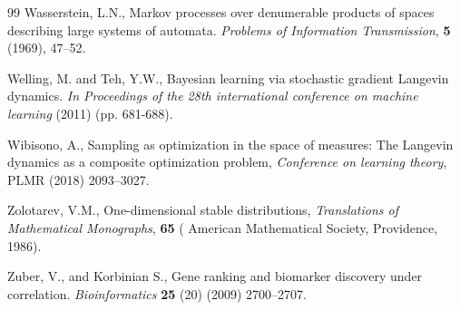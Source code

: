 \documentclass{article}
\begin{document}
\begin{thebibliography}{99}
 Wasserstein, L.N., Markov processes over denumerable products of spaces describing large systems of automata. \emph{Problems of Information Transmission},  \textbf{5} (1969), 47--52.

Welling, M. and Teh, Y.W.,  Bayesian learning via stochastic gradient Langevin dynamics. \emph{In Proceedings of the 28th international conference on machine learning} (2011)   (pp. 681-688).

Wibisono, A., Sampling as optimization in the space of measures: The Langevin dynamics as a composite optimization problem,
\emph{Conference on learning theory}, PLMR (2018) 2093--3027.

Zolotarev, V.M.,  One-dimensional stable distributions, \textit{Translations of Mathematical Monographs}, \textbf{65}  ( American Mathematical Society, Providence, 1986).

Zuber, V., and Korbinian S., Gene ranking and biomarker discovery under correlation. \emph{Bioinformatics} \textbf{25} (20) (2009) 2700--2707.




\end{thebibliography}
\end{document}
